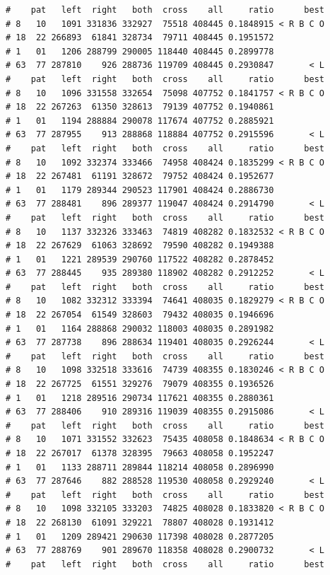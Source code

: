 \documentclass{article}\usepackage[]{graphicx}\usepackage[]{color}
\makeatletter
\newenvironment{kframe}{%
 \def\at@end@of@kframe{}%
 \ifinner\ifhmode%
  \def\at@end@of@kframe{\end{minipage}}%
  \begin{minipage}{\columnwidth}%
 \fi\fi%
 \def\FrameCommand##1{\hskip\@totalleftmargin \hskip-\fboxsep
 \colorbox{shadecolor}{##1}\hskip-\fboxsep
     \hskip-\linewidth \hskip-\@totalleftmargin \hskip\columnwidth}%
 \MakeFramed {\advance\hsize-\width
   \@totalleftmargin\z@ \linewidth\hsize
   \@setminipage}}%
 {\par\unskip\endMakeFramed%
 \at@end@of@kframe}
\newenvironment{knitrout}{}{} %
\makeatother
\begin{document}
\begin{knitrout}
\begin{kframe}
\begin{verbatim}
#    pat   left  right   both  cross    all     ratio      best
# 8   10   1091 331836 332927  75518 408445 0.1848915 < R B C O
# 18  22 266893  61841 328734  79711 408445 0.1951572          
# 1   01   1206 288799 290005 118440 408445 0.2899778          
# 63  77 287810    926 288736 119709 408445 0.2930847       < L
#    pat   left  right   both  cross    all     ratio      best
# 8   10   1096 331558 332654  75098 407752 0.1841757 < R B C O
# 18  22 267263  61350 328613  79139 407752 0.1940861          
# 1   01   1194 288884 290078 117674 407752 0.2885921          
# 63  77 287955    913 288868 118884 407752 0.2915596       < L
#    pat   left  right   both  cross    all     ratio      best
# 8   10   1092 332374 333466  74958 408424 0.1835299 < R B C O
# 18  22 267481  61191 328672  79752 408424 0.1952677          
# 1   01   1179 289344 290523 117901 408424 0.2886730          
# 63  77 288481    896 289377 119047 408424 0.2914790       < L
#    pat   left  right   both  cross    all     ratio      best
# 8   10   1137 332326 333463  74819 408282 0.1832532 < R B C O
# 18  22 267629  61063 328692  79590 408282 0.1949388          
# 1   01   1221 289539 290760 117522 408282 0.2878452          
# 63  77 288445    935 289380 118902 408282 0.2912252       < L
#    pat   left  right   both  cross    all     ratio      best
# 8   10   1082 332312 333394  74641 408035 0.1829279 < R B C O
# 18  22 267054  61549 328603  79432 408035 0.1946696          
# 1   01   1164 288868 290032 118003 408035 0.2891982          
# 63  77 287738    896 288634 119401 408035 0.2926244       < L
#    pat   left  right   both  cross    all     ratio      best
# 8   10   1098 332518 333616  74739 408355 0.1830246 < R B C O
# 18  22 267725  61551 329276  79079 408355 0.1936526          
# 1   01   1218 289516 290734 117621 408355 0.2880361          
# 63  77 288406    910 289316 119039 408355 0.2915086       < L
#    pat   left  right   both  cross    all     ratio      best
# 8   10   1071 331552 332623  75435 408058 0.1848634 < R B C O
# 18  22 267017  61378 328395  79663 408058 0.1952247          
# 1   01   1133 288711 289844 118214 408058 0.2896990          
# 63  77 287646    882 288528 119530 408058 0.2929240       < L
#    pat   left  right   both  cross    all     ratio      best
# 8   10   1098 332105 333203  74825 408028 0.1833820 < R B C O
# 18  22 268130  61091 329221  78807 408028 0.1931412          
# 1   01   1209 289421 290630 117398 408028 0.2877205          
# 63  77 288769    901 289670 118358 408028 0.2900732       < L
#    pat   left  right   both  cross    all     ratio      best

\end{verbatim}
\end{kframe}
\end{knitrout}
\end{document}
